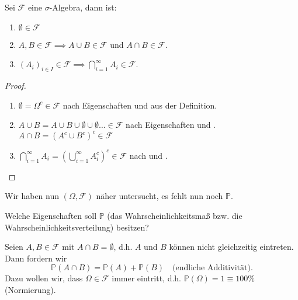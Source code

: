 \begin{lemma}\label{lm:weitere-eigenschaften-einer-sigma-algebra}
    Sei $\mathcal{F}$ eine $\sigma$-Algebra, dann ist:
    \begin{enumerate}[label=\protect\circled{\alph*}]
        \item $\emptyset\in \mathcal{F}$
        \item $A,B \in \mathcal{F} \implies A \cup B \in \mathcal{F}$ und $A\cap B \in \mathcal{F}$.
        \item $(A_i)_{i \in I}\in \mathcal{F} \implies \bigcap_{i=1}^{\infty}A_i \in \mathcal{F}$.
    \end{enumerate}
\end{lemma}
\begin{proof}
    \begin{enumerate}[label=\protect\circled{\alph*}]
        \item $\emptyset = \Omega^{c} \in \mathcal{F}$ nach Eigenschaften  und  aus der Definition.
        \item $A \cup B = A \cup B \cup \emptyset \cup \emptyset \ldots \in \mathcal{F}$ nach Eigenschaften   und . $A \cap B = (A^{c}\cup B ^{c})^{c} \in \mathcal{F}$
        \item $\bigcap_{i=1}^{\infty}A_i = \left( \bigcup_{i=1}^{\infty}A_i^{c} \right) ^{c}\in \mathcal{F}$ nach  und .
    \end{enumerate}
\end{proof}

Wir haben nun $(\Omega, \mathcal{F})$ näher untersucht, es fehlt nun noch $\mathbb{P}$. 
\begin{question}
    Welche Eigenschaften soll $\mathbb{P}$ (das Wahrscheinlichkeitsmaß bzw. die Wahrscheinlichkeitsverteilung) besitzen?
\end{question}
Seien $A,B \in \mathcal{F}$ mit $A\cap B = \emptyset$, d.h. $A$ und $B$ können nicht gleichzeitig eintreten. Dann fordern wir
\[
    \mathbb{P}(A \cap B) = \mathbb{P}(A) + \mathbb{P}(B) \quad \text{(endliche Additivität)}
.\] 
Dazu wollen wir, dass $\Omega \in \mathcal{F}$ immer eintritt, d.h. $\mathbb{P}(\Omega) = 1 \equiv  100\%$ (Normierung).

